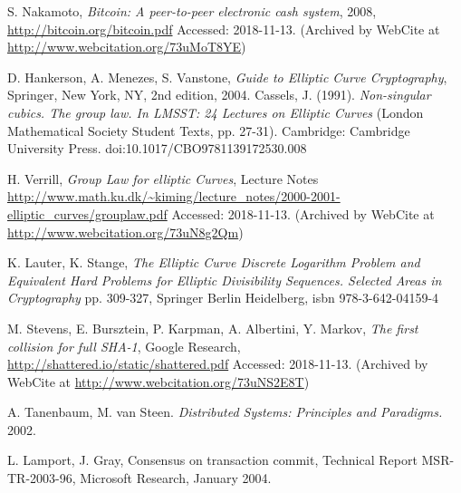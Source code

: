 \documentclass[final, 12pt,oneside]{class_diss}
\begin{document}
%
\begin{thebibliography}{10}
S. Nakamoto, \textit{Bitcoin: A peer-to-peer electronic cash system}, 2008, \url{http://bitcoin.org/bitcoin.pdf}  Accessed: 2018-11-13. (Archived by WebCite at \url{http://www.webcitation.org/73uMoT8YE})

  D. Hankerson, A. Menezes, S. Vanstone,
  \textit{Guide to Elliptic Curve Cryptography},
  \newline Springer, New York, NY,
  2nd edition,
  2004.
Cassels, J. (1991). 
\textit{Non-singular cubics. The group law. In LMSST: 24 Lectures on Elliptic Curves}
 (London Mathematical Society Student Texts, pp. 27-31). Cambridge: Cambridge University Press. doi:10.1017/CBO9781139172530.008
 
 H. Verrill, \textit{Group Law for elliptic Curves}, Lecture Notes \url{http://www.math.ku.dk/~kiming/lecture_notes/2000-2001-elliptic_curves/grouplaw.pdf} Accessed: 2018-11-13. (Archived by WebCite at \url{http://www.webcitation.org/73uN8g2Qm})
 
K. Lauter, K. Stange, \textit{The Elliptic Curve Discrete Logarithm Problem and Equivalent Hard Problems for Elliptic Divisibility Sequences. Selected Areas in Cryptography} pp. 309-327, Springer Berlin Heidelberg, isbn 978-3-642-04159-4
 

M. Stevens, E. Bursztein, P. Karpman, A. Albertini, Y. Markov, \textit{The first collision for full SHA-1}, Google Research, \url{http://shattered.io/static/shattered.pdf} Accessed: 2018-11-13. (Archived by WebCite at \url{http://www.webcitation.org/73uNS2E8T}) 
 
 A. Tanenbaum, M. van Steen. 
 \textit{Distributed Systems: Principles and Paradigms.} 2002.
 
L. Lamport, J. Gray, Consensus on transaction commit, Technical
Report MSR-TR-2003-96, Microsoft Research, January 2004.



\end{thebibliography}
\end{document}
